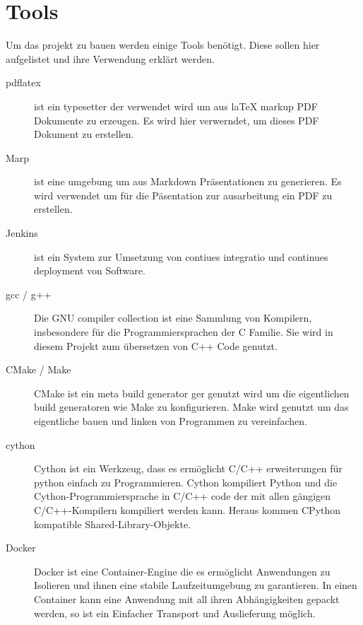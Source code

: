 \chapter{Tools}
\label{chap:tools}

Um das projekt zu bauen werden einige Tools benötigt. Diese sollen hier aufgelistet und ihre Verwendung erklärt werden.

\begin{description}
    \item[pdflatex] ist ein typesetter der verwendet wird um aus laTeX markup PDF Dokumente zu erzeugen. Es wird hier verwerndet, um dieses PDF Dokument zu erstellen.
    \item[Marp] ist eine  umgebung um aus Markdown Präsentationen zu generieren. Es wird verwendet um für die Päsentation zur ausarbeitung ein PDF zu erstellen.
    \item[Jenkins] ist ein System zur Umsetzung von \glqq contiues integratio \grqq{} und \glqq continues deployment\grqq{} von Software.
    \item[gcc / g++] Die GNU compiler collection ist eine Sammlung von Kompilern, insbesondere für die Programmiersprachen der C Familie. Sie wird in diesem Projekt zum übersetzen von C++ Code genutzt.
    \item[CMake / Make] CMake ist ein meta build generator ger genutzt wird um die eigentlichen build generatoren wie Make zu konfigurieren. Make wird genutzt um das eigentliche bauen und linken von Programmen zu vereinfachen.
    \item[cython] Cython ist ein Werkzeug, dass es ermöglicht C/C++ erweiterungen für python einfach zu Programmieren. Cython kompiliert Python und die Cython-Programmiersprache in C/C++ code der mit allen gängigen C/C++-Kompilern kompiliert werden kann. Heraus kommen CPython kompatible Shared-Library-Objekte.
    \item[Docker] Docker ist eine Container-Engine die es ermöglicht Anwendungen zu Isolieren und ihnen eine stabile Laufzeitumgebung zu garantieren. In einen Container kann eine Anwendung mit all ihren Abhängigkeiten gepackt werden, so ist ein Einfacher Transport und Auslieferung möglich.
\end{description}
